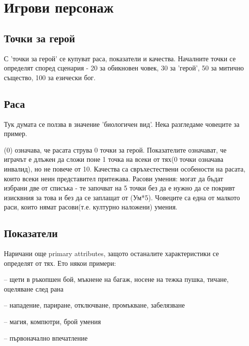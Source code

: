 
\chapter{Игрови персонаж}

\section{Точки за герой}
С 'точки за герой' се купуват раса, показатели и качества.
Началните точки се определят според сценария - 20 за обикновен човек, 30 за 'герой', 50 за митично същество, 100 за езически бог.


\section{Раса}
Тук думата се ползва в значение 'биологичен вид'.
Нека разгледаме човеците за пример.
\begin{multicols}{2}
(0) означава, че расата струва 0 точки за герой.
Показателите означават, че играчът е длъжен да сложи поне 1 точка на всеки от тях(0 точки означава инвалид), но не повече от 10.
Качества са свръхестествени особености на расата, които всеки неин представител притежава.
Расови умения: могат да бъдат избрани две от списъка - те започват на 5 точки без да е нужно да се покривт изисквния за това и без да се заплащат от (Ум*5).
Човеците са една от малкото раси, които нямат расови(т.е. културно наложени) умения.
\end{multicols}


\section{Показатели}
Наричани още primary attributes, защото останалите характеристики се определят от тях.
Ето някои примери:
\begin{itemize*}
\item {} – щети в ръкопшен бой, мъкнене на багаж, носене на тежка пушка, тичане, оцеляване след рана
\item {} – нападение, париране, отключване, промъкване, забелязване
\item {} – магия, компютри, брой умения
\item {} – първоначално впечатление
\end{itemize*}


